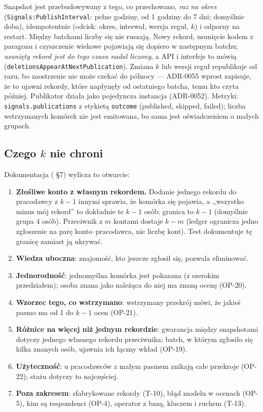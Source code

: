 Snapshot jest przebudowywany z tego, co przechowano, \emph{raz na okres}
(\texttt{Signals:PublishInterval}: pełne godziny, od 1 godziny do 7 dni; domyślnie
doba), idempotentnie (odcisk: okres, interwał, wersja reguł, $k$) i odporny na
restart. Między batchami liczby się nie ruszają. Nowy rekord, usunięcie kodem z
paragonu i czyszczenie wiekowe pojawiają się dopiero w następnym batchu;
\emph{usunięty rekord jest do tego czasu nadal liczony}, a API i interfejs to
mówią (\texttt{deletionsAppearAtNextPublication}). Zmiana $k$ lub wersji reguł
republikuje od razu, bo zaostrzenie nie może czekać do północy --- ADR-0055
wprost zapisuje, że to ujawni rekordy, które napłynęły od ostatniego batcha,
temu kto czyta później. Publikator działa jako pojedyncza instancja (ADR-0052).
Metryki: \texttt{signals.publications} z etykietą \texttt{outcome} (published,
skipped, failed); liczba wstrzymanych komórek nie jest emitowana, bo sama jest
oświadczeniem o małych grupach.

\subsection{\texorpdfstring{Czego $k$ nie chroni}{Czego k nie chroni}}

Dokumentacja ( §7) wylicza to otwarcie:

\begin{enumerate}[leftmargin=*]
    \item \textbf{Złośliwe konto z własnym rekordem.} Dodanie jednego rekordu do
    pracodawcy z $k-1$ innymi sprawia, że komórka się pojawia, a ,,wszystko
    minus mój rekord'' to dokładnie te $k-1$ osób; granica to $k-1$ (domyślnie
    grupa 4 osób). Przeciwnik z $m$ kontami dostaje $k-m$ (ledger ogranicza jedno
    zgłoszenie na parę konto--pracodawca, nie liczbę kont). Test dokumentuje tę
    granicę zamiast ją ukrywać.
    \item \textbf{Wiedza uboczna}: znajomość, kto jeszcze zgłosił się, pozwala
    eliminować.
    \item \textbf{Jednorodność}: jednomyślna komórka jest pokazana (z szerokim
    przedziałem); osoba znana jako należąca do niej ma znaną ocenę (OP-20).
    \item \textbf{Wzorzec tego, co wstrzymano}: wstrzymany przekrój mówi, że
    jakieś pasmo ma od 1 do $k-1$ ocen (OP-21).
    \item \textbf{Różnice na więcej niż jednym rekordzie}: gwarancja między
    snapshotami dotyczy jednego własnego rekordu przeciwnika; batch, w którym
    zgłosiło się kilka znanych osób, ujawnia ich łączny wkład (OP-19).
    \item \textbf{Użyteczność}: u pracodawców z małym pasmem znikają całe przekroje
    (OP-22); stażu dotyczy to najczęściej.
    \item \textbf{Poza zakresem}: sfabrykowane rekordy (T-10), błąd modelu w
    ocenach (OP-5), kim są respondenci (OP-4), operator z bazą, kluczem i ruchem (T-13).
\end{enumerate}

